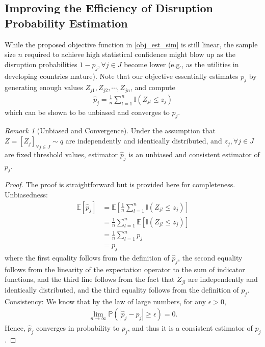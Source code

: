 \documentclass[preprint]{oscmjournal}
\theoremstyle{remark}
\newtheorem{remark}{Remark}
\begin{document}
\subsection{Improving the Efficiency of Disruption Probability Estimation}

While the proposed objective function in \eqref{obj_est_sim} is still linear, the sample size $n$ required to achieve high statistical confidence might blow up as the disruption probabilities $1 - p_j, \forall j \in J$ become lower (e.g., as the utilities in developing countries mature). Note that our objective essentially estimates $p_j$ by generating enough values $Z_{j1}, Z_{j2}, \cdots, Z_{jn}$, and compute
\begin{align}
\hat p_j = \frac1n \sum_{l=1}^n \mathbb I(Z_{jl} \leq z_j) 
\end{align}
which can be shown to be unbiased and converges to $p_j$.

\begin{remark}[Unbiased and Convergence]
\label{pf:unbiasedness}
Under the assumption that $Z = [Z_j]_{\forall j \in J} \sim q$ are independently and identically distributed, and $z_j, \forall j \in J$ are fixed threshold values,  estimator $\hat p_j$ is an unbiased and consistent estimator of $p_j$.
\end{remark}
\begin{proof}
The proof is straightforward but is provided here for completeness. 
\\
Unbiasedness:
\begin{align}
\mathbb E[\hat p_j] &= \mathbb E \left[ \frac1n \sum_{l=1}^n \mathbb I(Z_{jl} \leq z_j) \right] \\
&= \frac1n \sum_{l=1}^n \mathbb E \left[ \mathbb I(Z_{jl} \leq z_j) \right] \\
&= \frac1n \sum_{l=1}^n p_j \\
&= p_j
\end{align}
where the first equality follows from the definition of $\hat p_j$, the second equality follows from the linearity of the expectation operator to the sum of indicator functions, and the third line follows from the fact that $Z_{jl}$ are independently and identically distributed, and the third equality follows from the definition of $p_j$.
\\
Consistency:
We know that by the law of large numbers, for any $\epsilon > 0$,
\begin{align}
\lim_{n \to \infty} \mathbb P\left(\left|\hat p_j - p_j\right| \geq \epsilon\right) = 0.
\end{align}
Hence, $\hat p_j$ converges in probability to $p_j$, and thus it is a consistent estimator of $p_j$.
\end{proof}
\end{document}
